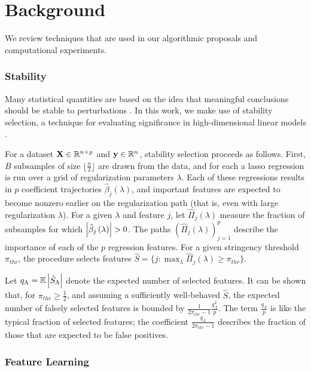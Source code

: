 
\section{Background}
\label{sec:context}

We review techniques that are used in our algorithmic proposals and
computational experiments.

\subsubsection{Stability}

Many statistical quantities are based on the idea that meaningful conclusions
should be stable to perturbations \cite{yu2013stability}. In this work, we make
use of stability selection, a technique for evaluating significance in
high-dimensional linear models \cite{meinshausen2010stability}.

For a dataset $\mathbf{X}\in \mathbb{R}^{n \times p}$ and $\mathbf{y} \in
\mathbb{R}^{n}$, stability selection proceeds as follows. First, $B$ subsamples of
size $\lfloor \frac{n}{2} \rfloor$ are drawn from the data, and for each a lasso
regression is run over a grid of regularization parameters $\lambda$. Each of
these regressions results in $p$ coefficient trajectories
$\hat{\beta}_{j}\left(\lambda\right)$, and important features are expected to
become nonzero earlier on the regularization path (that is, even with large
regularization $\lambda$). For a given $\lambda$ and feature $j$, let
$\hat{\Pi}_{j}\left(\lambda\right)$ measure the fraction of subsamples for which
$\left|\hat{\beta}_j\left(\lambda\right)\right| > 0$. The paths
$\left(\hat{\Pi}_{j}\left(\lambda\right)\right)_{j = 1}^{p}$ describe the
importance of each of the $p$ regression features. For a given stringency
threshold $\pi_{thr}$, the procedure selects features $\hat{S} = \{j :
\max_{\lambda} \hat{\Pi}_{j}\left(\lambda\right) \geq \pi_{thr}\}$.

Let $q_{\Lambda} = \mathbb{E}\left|{\hat{S}_{\Lambda}}\right|$ denote the expected number of
selected features. It can be shown that, for $\pi_{thr} \geq \frac{1}{2}$, and
assuming a sufficiently well-behaved $\hat{S}$, the expected number of falsely
selected features is bounded by $\frac{1}{2\pi_{thr} - 1}
\frac{q_{\Lambda}^2}{p}$. The term $\frac{q_{\Lambda}}{p}$ is like the typical
fraction of selected features; the coefficient $\frac{q_{\Lambda}}{2\pi_{thr} -
  1}$ describes the fraction of those that are expected to be false positives.

\subsubsection{Feature Learning}


